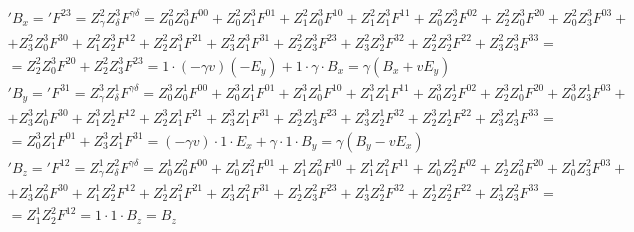 \documentclass[__main__.tex]{subfiles}
\begin{document}
\begin{gather*}
'B_x ='F^{23} = Z^2_\gamma Z^3_\delta F^{\gamma \delta} = Z^2_0 Z^3_0 F^{00}+Z^2_0 Z^3_1 F^{01}+Z^2_1 Z^3_0 F^{10}+Z^2_1 Z^3_1 F^{11}+Z^2_0 Z^3_2 F^{02}+Z^2_2 Z^3_0 F^{20}+Z^2_0 Z^3_3 F^{03}+\\+Z^2_3 Z^3_0 F^{30}+Z^2_1 Z^3_2 F^{12}+Z^2_2 Z^3_1 F^{21}+Z^2_3 Z^3_1 F^{31}+Z^2_2 Z^3_3 F^{23}+Z^2_3 Z^3_2 F^{32}+Z^2_2 Z^3_2 F^{22}+Z^2_3 Z^3_3 F^{33}=\\
=Z^2_2 Z^3_0 F^{20}+Z^2_2 Z^3_3 F^{23}=1 \cdot (-\gamma v)(-E_y)+1 \cdot \gamma \cdot B_x=\gamma (B_x+vE_y)
\end{gather*}
\begin{gather*}
'B_y ='F^{31} = Z^3_\gamma Z^1_\delta F^{\gamma \delta} = Z^3_0 Z^1_0 F^{00}+Z^3_0 Z^1_1 F^{01}+Z^3_1 Z^1_0 F^{10}+Z^3_1 Z^1_1 F^{11}+Z^3_0 Z^1_2 F^{02}+Z^3_2 Z^1_0 F^{20}+Z^3_0 Z^1_3 F^{03}+\\+Z^3_3 Z^1_0 F^{30}+Z^3_1 Z^1_2 F^{12}+Z^3_2 Z^1_1 F^{21}+Z^3_3 Z^1_1 F^{31}+Z^3_2 Z^1_3 F^{23}+Z^3_3 Z^1_2 F^{32}+Z^3_2 Z^1_2 F^{22}+Z^3_3 Z^1_3 F^{33}=\\
=Z^3_0 Z^1_1 F^{01}+Z^3_3 Z^1_1 F^{31}=(-\gamma v)\cdot 1 \cdot E_x+\gamma \cdot 1 \cdot B_y = \gamma(B_y-vE_x)
\end{gather*}
\begin{gather*}
'B_z ='F^{12} = Z^1_\gamma Z^2_\delta F^{\gamma \delta} = Z^1_0 Z^2_0 F^{00}+Z^1_0 Z^2_1 F^{01}+Z^1_1 Z^2_0 F^{10}+Z^1_1 Z^2_1 F^{11}+Z^1_0 Z^2_2 F^{02}+Z^1_2 Z^2_0 F^{20}+Z^1_0 Z^2_3 F^{03}+\\+Z^1_3 Z^2_0 F^{30}+Z^1_1 Z^2_2 F^{12}+Z^1_2 Z^2_1 F^{21}+Z^1_3 Z^2_1 F^{31}+Z^1_2 Z^2_3 F^{23}+Z^1_3 Z^2_2 F^{32}+Z^1_2 Z^2_2 F^{22}+Z^1_3 Z^2_3 F^{33}=\\
=Z^1_1 Z^2_2 F^{12} = 1\cdot 1\cdot B_z = B_z
\end{gather*}
\end{document}
